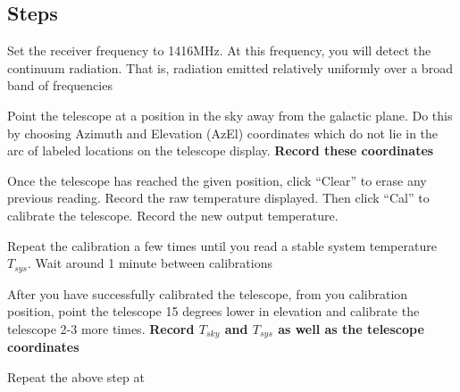 \subsection{Steps}
\begin{steps}
	\item Set the receiver frequency to 1416MHz. At this frequency, you will detect the continuum radiation. That is, radiation emitted relatively uniformly over a broad band of frequencies  
	
	\item Point the telescope at a position in the sky away from the galactic plane. Do this by choosing Azimuth and Elevation (AzEl) coordinates which do not lie in the arc of labeled locations on the telescope display. \textbf{Record these coordinates}
	
	\item Once the telescope has reached the given position, click ``Clear'' to erase any previous reading. Record the raw temperature displayed. Then click ``Cal'' to calibrate the telescope. Record the new output temperature. 
	
	\item Repeat the calibration a few times until you read a stable system temperature $T_{sys}$. Wait around 1 minute between calibrations
	
	\item After you have successfully calibrated the telescope, from you calibration position, point the telescope 15 degrees lower in elevation and calibrate the telescope 2-3 more times. \textbf{Record $T_{sky}$ and $T_{sys}$ as well as the telescope coordinates}
	
	\item Repeat the above step at 
\end{steps}